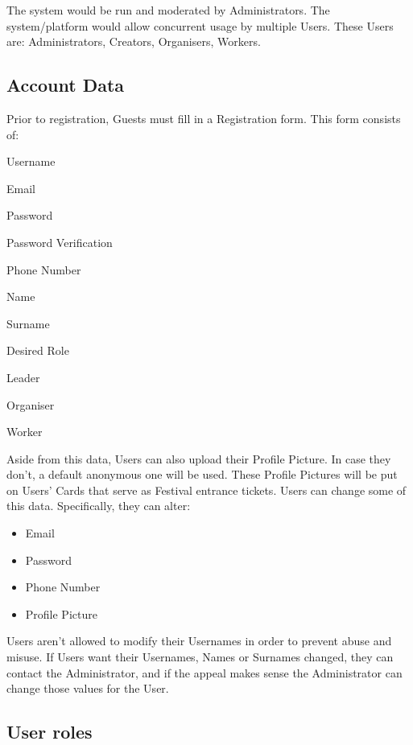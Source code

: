 The system would be run and moderated by Administrators. The system/platform would allow concurrent usage by multiple Users. These Users are: Administrators, Creators, Organisers, Workers.


	\subsection{Account Data}
	Prior to registration, Guests must fill in a Registration form. This form consists of: 
	\begin{packed_item}
		\item Username
		\item Email
		\item Password
		\item Password Verification
		\item Phone Number
		\item Name
		\item Surname
		\item Desired Role
		\begin{packed_enum}
			\item Leader
			\item Organiser
			\item Worker
		\end{packed_enum}
	\end{packed_item}

	Aside from this data, Users can also upload their Profile Picture. In case they don't, a default anonymous one will be used. These Profile Pictures will be put on Users' Cards that serve as Festival entrance tickets.
Users can change some of this data. Specifically, they can alter:
	\begin{itemize}
		\item Email
		\item Password
		\item Phone Number
		\item Profile Picture
	\end{itemize}
	
	Users aren't allowed to modify their Usernames in order to prevent abuse and misuse. If Users want their Usernames, Names or Surnames changed, they can contact the Administrator, and if the appeal makes sense the Administrator can change those values for the User.
	
	\subsection{User roles}
